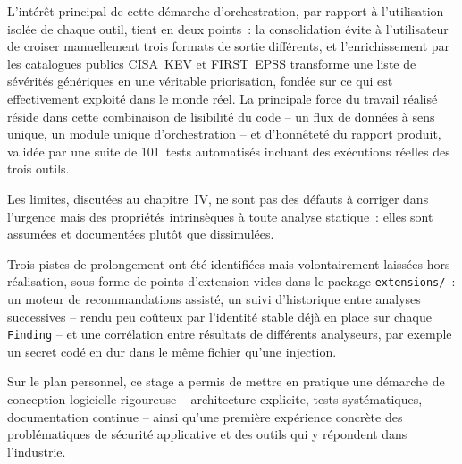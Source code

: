\documentclass[12pt,a4paper,oneside]{report}
\begin{document}
L'int\'er\^et principal de cette d\'emarche d'orchestration, par rapport \`a l'utilisation isol\'ee de chaque outil, tient en deux points~: la consolidation \'evite \`a l'utilisateur de croiser manuellement trois formats de sortie diff\'erents, et l'enrichissement par les catalogues publics CISA~KEV et FIRST~EPSS transforme une liste de s\'ev\'erit\'es g\'en\'eriques en une v\'eritable priorisation, fond\'ee sur ce qui est effectivement exploit\'e dans le monde r\'eel. La principale force du travail r\'ealis\'e r\'eside dans cette combinaison de lisibilit\'e du code -- un flux de donn\'ees \`a sens unique, un module unique d'orchestration -- et d'honn\^etet\'e du rapport produit, valid\'ee par une suite de 101~tests automatis\'es incluant des ex\'ecutions r\'eelles des trois outils.

Les limites, discut\'ees au chapitre~IV, ne sont pas des d\'efauts \`a corriger dans l'urgence mais des propri\'et\'es intrins\`eques \`a toute analyse statique~: elles sont assum\'ees et document\'ees plut\^ot que dissimul\'ees.

Trois pistes de prolongement ont \'et\'e identifi\'ees mais volontairement laiss\'ees hors r\'ealisation, sous forme de points d'extension vides dans le package \texttt{extensions/}~: un moteur de recommandations assist\'e, un suivi d'historique entre analyses successives -- rendu peu co\^uteux par l'identit\'e stable d\'ej\`a en place sur chaque \texttt{Finding} -- et une corr\'elation entre r\'esultats de diff\'erents analyseurs, par exemple un secret cod\'e en dur dans le m\^eme fichier qu'une injection.

Sur le plan personnel, ce stage a permis de mettre en pratique une d\'emarche de conception logicielle rigoureuse -- architecture explicite, tests syst\'ematiques, documentation continue -- ainsi qu'une premi\`ere exp\'erience concr\`ete des probl\'ematiques de s\'ecurit\'e applicative et des outils qui y r\'epondent dans l'industrie.
\end{document}
